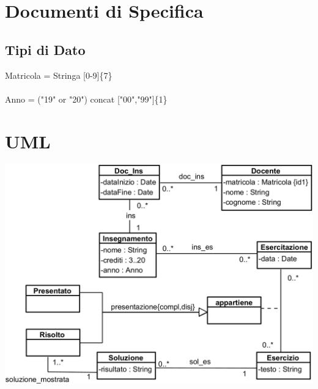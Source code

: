 \documentclass[12pt, letterpaper]{article}
\newcommand{\acc}{\\\hphantom{}\\}
\begin{document}
\section{Documenti di Specifica}
\subsection{Tipi di Dato}
Matricola = Stringa [0-9]\{7\}\acc 
Anno = ("19" or "20") concat ["00","99"]\{1\}
\section{UML}
\begin{center}
    \includegraphics[width=\textwidth]{images/UML.png}
\end{center}
\end{document}
